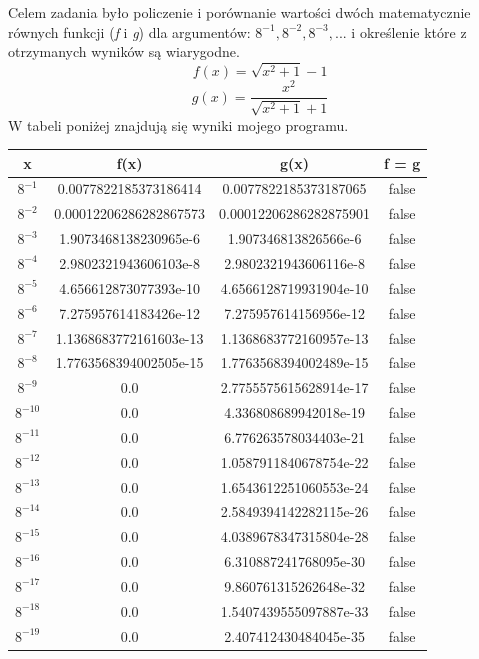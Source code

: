 \documentclass[]{article}
\begin{document}
	Celem zadania było policzenie i porównanie wartości dwóch matematycznie równych funkcji (\textit{f} i \textit{g}) dla argumentów: \(8^{-1}, 8^{-2}, 8^{-3}, ...\) i określenie które z otrzymanych wyników są wiarygodne.
	\[f(x) = \sqrt{x^2 + 1} - 1\]
	\[g(x) = \frac{x^2}{\sqrt{x^2 + 1} + 1}\]
	W tabeli poniżej znajdują się wyniki mojego programu.
	\begin{table}[!h]
		\centering
		\label{tab:table1}
		\begin{tabular}{|c|c|c|c|}
			\hline
			x & f(x) & g(x) & f = g \\ \hline
			$8^{-1}$ & 0.0077822185373186414 & 0.0077822185373187065 & false \\ \hline
			$8^{-2}$ & 0.00012206286282867573 & 0.00012206286282875901 & false \\ \hline
			$8^{-3}$ & 1.9073468138230965e-6 & 1.907346813826566e-6 & false \\ \hline
			$8^{-4}$ & 2.9802321943606103e-8 & 2.9802321943606116e-8 & false \\ \hline
			$8^{-5}$ & 4.656612873077393e-10 & 4.6566128719931904e-10 & false \\ \hline
			$8^{-6}$ & 7.275957614183426e-12 & 7.275957614156956e-12 & false \\ \hline
			$8^{-7}$ & 1.1368683772161603e-13 & 1.1368683772160957e-13 & false \\ \hline
			$8^{-8}$ & 1.7763568394002505e-15 & 1.7763568394002489e-15 & false \\ \hline
			$8^{-9}$ & 0.0 & 2.7755575615628914e-17 & false \\ \hline
			$8^{-10}$ & 0.0 & 4.336808689942018e-19 & false \\ \hline
			$8^{-11}$ & 0.0 & 6.776263578034403e-21 & false \\ \hline
			$8^{-12}$ & 0.0 & 1.0587911840678754e-22 & false \\ \hline
			$8^{-13}$ & 0.0 & 1.6543612251060553e-24 & false \\ \hline
			$8^{-14}$ & 0.0 & 2.5849394142282115e-26 & false \\ \hline
			$8^{-15}$ & 0.0 & 4.0389678347315804e-28 & false \\ \hline
			$8^{-16}$ & 0.0 & 6.310887241768095e-30 & false \\ \hline
			$8^{-17}$ & 0.0 & 9.860761315262648e-32 & false \\ \hline
			$8^{-18}$ & 0.0 & 1.5407439555097887e-33 & false \\ \hline
			$8^{-19}$ & 0.0 & 2.407412430484045e-35 & false \\ \hline

\end{tabular}
\end{table}
\end{document}

